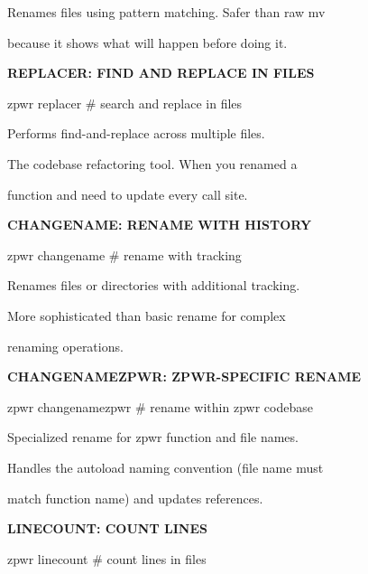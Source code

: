 \documentclass[11pt,a4paper,twoside]{book}
\begin{document}
Renames files using pattern matching. Safer than raw mv

because it shows what will happen before doing it.


\vspace{12pt}
{\bfseries\color{neonyellow} REPLACER: FIND AND REPLACE IN FILES}\vspace{4pt}

\begin{codebox}
zpwr replacer                       \# search and replace in files\\
\end{codebox}

Performs find-and-replace across multiple files.

The codebase refactoring tool. When you renamed a

function and need to update every call site.


\vspace{12pt}
{\bfseries\color{neonyellow} CHANGENAME: RENAME WITH HISTORY}\vspace{4pt}

\begin{codebox}
zpwr changename                     \# rename with tracking\\
\end{codebox}

Renames files or directories with additional tracking.

More sophisticated than basic rename for complex

renaming operations.


\vspace{12pt}
{\bfseries\color{neonyellow} CHANGENAMEZPWR: ZPWR-SPECIFIC RENAME}\vspace{4pt}

\begin{codebox}
zpwr changenamezpwr                 \# rename within zpwr codebase\\
\end{codebox}

Specialized rename for zpwr function and file names.

Handles the autoload naming convention (file name must

match function name) and updates references.


\vspace{12pt}
{\bfseries\color{neonyellow} LINECOUNT: COUNT LINES}\vspace{4pt}

\begin{codebox}
zpwr linecount                      \# count lines in files\\
\end{codebox}
\end{document}
